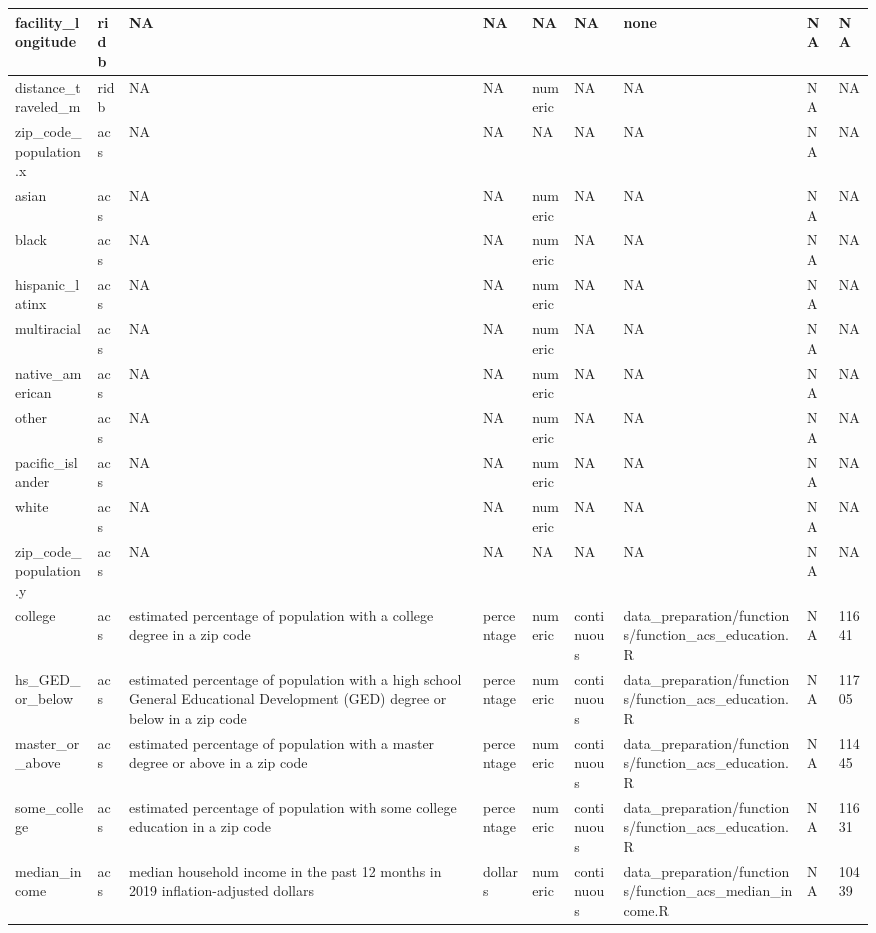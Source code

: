 \documentclass[
]{book}
\begin{document}
\begin{table}
\begin{tabular}[t]{l|l|l|l|l|l|l|l|l}
\hline
facility\_longitude & ridb & NA & NA & NA & NA & none & NA & NA\\
\hline
distance\_traveled\_m & ridb & NA & NA & numeric & NA & NA & NA & NA\\
\hline
zip\_code\_population.x & acs & NA & NA & NA & NA & NA & NA & NA\\
\hline
asian & acs & NA & NA & numeric & NA & NA & NA & NA\\
\hline
black & acs & NA & NA & numeric & NA & NA & NA & NA\\
\hline
hispanic\_latinx & acs & NA & NA & numeric & NA & NA & NA & NA\\
\hline
multiracial & acs & NA & NA & numeric & NA & NA & NA & NA\\
\hline
native\_american & acs & NA & NA & numeric & NA & NA & NA & NA\\
\hline
other & acs & NA & NA & numeric & NA & NA & NA & NA\\
\hline
pacific\_islander & acs & NA & NA & numeric & NA & NA & NA & NA\\
\hline
white & acs & NA & NA & numeric & NA & NA & NA & NA\\
\hline
zip\_code\_population.y & acs & NA & NA & NA & NA & NA & NA & NA\\
\hline
college & acs & estimated percentage of population with a college degree in a zip code & percentage & numeric & continuous & data\_preparation/functions/function\_acs\_education.R & NA & 11641\\
\hline
hs\_GED\_or\_below & acs & estimated percentage of population with a high school General Educational Development (GED) degree or below in a zip code & percentage & numeric & continuous & data\_preparation/functions/function\_acs\_education.R & NA & 11705\\
\hline
master\_or\_above & acs & estimated percentage of population with a master degree or above in a zip code & percentage & numeric & continuous & data\_preparation/functions/function\_acs\_education.R & NA & 11445\\
\hline
some\_college & acs & estimated percentage of population with some college education in a zip code & percentage & numeric & continuous & data\_preparation/functions/function\_acs\_education.R & NA & 11631\\
\hline
median\_income & acs & median household income in the past 12 months in 2019 inflation-adjusted dollars & dollars & numeric & continuous & data\_preparation/functions/function\_acs\_median\_income.R & NA & 10439\\

\end{tabular}
\end{table}
\end{document}

